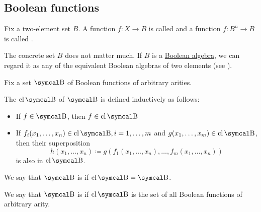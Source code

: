\subsection{Boolean functions}\label{subsec:boolean_functions}

\begin{Definition}\label{def:boolean_function}
  Fix a two-element set \( B \). A function \( f: X \to B \) is called  and a function \( f: B^n \to B \) is called .

  The concrete set \( B \) does not matter much. If \( B \) is a \hyperref[def:boolean_algebra]{Boolean algebra}, we can regard it as any of the equivalent Boolean algebras of two elements (see ).
\end{Definition}

\begin{Definition}\label{def:boolean_closure}
  Fix a set \( \CB \) of Boolean functions of arbitrary arities.

  The  \( \Cl{\CB} \) of \( \CB \) is defined inductively as follows:
  \begin{itemize}
    \item If \( f \in \CB \), then \( f \in \Cl{\CB} \)
    \item If \( f_i(x_1, \ldots, x_n) \in \Cl{\CB}, i = 1, \ldots, m \) and \( g(x_1, \ldots, x_m) \in \Cl{\CB} \), then their superposition
    \begin{equation*}
      h(x_1, \ldots, x_n) \coloneqq g(f_1(x_1, \ldots, x_n), \ldots, f_m(x_1, \ldots, x_n))
    \end{equation*}
    is also in \( \Cl{\CB} \).
  \end{itemize}

  We say that \( \CB \) is  if \( \Cl{\CB} = \CB \).

  We say that \( \CB \) is  if \( \Cl{\CB} \) is the set of all Boolean functions of arbitrary arity.
\end{Definition}


